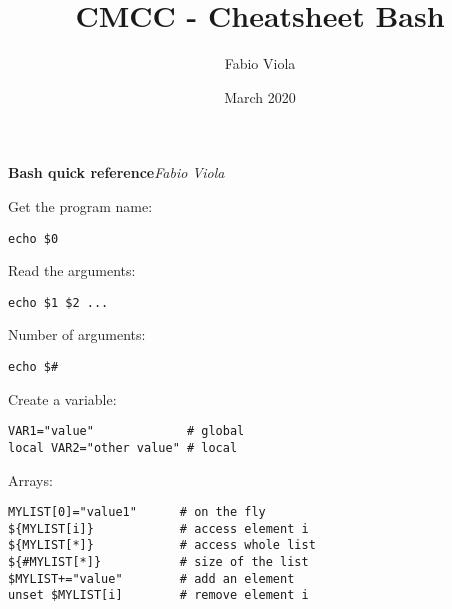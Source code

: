 \documentclass[twocolumn,8pt]{article}
\title{CMCC - Cheatsheet Bash}
\author{Fabio Viola}
\date{March 2020}
\begin{document}

\LARGE \textbf{Bash quick reference}\hfill \textit{\small Fabio Viola}\normalsize 


\begin{mdframed}[frametitle=Command-line arguments]
Get the program name:
\begin{lstlisting}
echo $0
\end{lstlisting}

Read the arguments:
\begin{lstlisting}
echo $1 $2 ...
\end{lstlisting}

Number of arguments:
\begin{lstlisting}
echo $#
\end{lstlisting}
\end{mdframed}


\begin{mdframed}[frametitle=Variables]
Create a variable:
\begin{lstlisting}
VAR1="value"             # global
local VAR2="other value" # local
\end{lstlisting}
Arrays:
\begin{lstlisting}
MYLIST[0]="value1"      # on the fly
${MYLIST[i]}            # access element i
${MYLIST[*]}            # access whole list
${#MYLIST[*]}           # size of the list
$MYLIST+="value"        # add an element
unset $MYLIST[i]        # remove element i
\end{lstlisting}
\end{mdframed}

\end{document}
